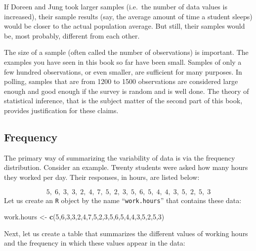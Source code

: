 \documentclass[]{krantz}
\makeatletter
\newenvironment{Shaded}{\begin{snugshade}}{\end{snugshade}}
\newcommand{\KeywordTok}[1]{\textcolor[rgb]{0.13,0.29,0.53}{\textbf{#1}}}
\newcommand{\DecValTok}[1]{\textcolor[rgb]{0.00,0.00,0.81}{#1}}
\newcommand{\StringTok}[1]{\textcolor[rgb]{0.31,0.60,0.02}{#1}}
\newcommand{\NormalTok}[1]{#1}
\newenvironment{kframe}{%
\medskip{}
\setlength{\fboxsep}{.8em}
 \def\at@end@of@kframe{}%
 \ifinner\ifhmode%
  \def\at@end@of@kframe{\end{minipage}}%
  \begin{minipage}{\columnwidth}%
 \fi\fi%
 \def\FrameCommand##1{\hskip\@totalleftmargin \hskip-\fboxsep
 \colorbox{shadecolor}{##1}\hskip-\fboxsep
     \hskip-\linewidth \hskip-\@totalleftmargin \hskip\columnwidth}%
 \MakeFramed {\advance\hsize-\width
   \@totalleftmargin\z@ \linewidth\hsize
   \@setminipage}}%
 {\par\unskip\endMakeFramed%
 \at@end@of@kframe}
\renewenvironment{Shaded}{\begin{kframe}}{\end{kframe}}
\theoremstyle{definition}
\theoremstyle{definition}
\theoremstyle{definition}
\theoremstyle{remark}
\makeatother
\begin{document}
If Doreen and Jung took larger samples (i.e.~the number of data values
is increased), their sample results (say, the average amount of time a
student sleeps) would be closer to the actual population average. But
still, their samples would be, most probably, different from each other.

The size of a sample (often called the number of observations) is
important. The examples you have seen in this book so far have been
small. Samples of only a few hundred observations, or even smaller, are
sufficient for many purposes. In polling, samples that are from 1200 to
1500 observations are considered large enough and good enough if the
survey is random and is well done. The theory of statistical inference,
that is the subject matter of the second part of this book, provides
justification for these claims.

\subsection{Frequency}\label{frequency}

The primary way of summarizing the variability of data is via the
frequency distribution. Consider an example. Twenty students were asked
how many hours they worked per day. Their responses, in hours, are
listed below:

\[5,\; 6,\; 3,\; 3,\; 2,\; 4,\; 7,\; 5,\; 2,\; 3,\; 5,\; 6,\; 5,\; 4,\; 4,\; 3,\; 5,\; 2,\; 5,\; 3\]
Let us create an \texttt{R} object by the name ``\texttt{work.hours}''
that contains these data:

\begin{Shaded}
\begin{Highlighting}[]
\NormalTok{work.hours <-}\StringTok{ }\KeywordTok{c}\NormalTok{(}\DecValTok{5}\NormalTok{,}\DecValTok{6}\NormalTok{,}\DecValTok{3}\NormalTok{,}\DecValTok{3}\NormalTok{,}\DecValTok{2}\NormalTok{,}\DecValTok{4}\NormalTok{,}\DecValTok{7}\NormalTok{,}\DecValTok{5}\NormalTok{,}\DecValTok{2}\NormalTok{,}\DecValTok{3}\NormalTok{,}\DecValTok{5}\NormalTok{,}\DecValTok{6}\NormalTok{,}\DecValTok{5}\NormalTok{,}\DecValTok{4}\NormalTok{,}\DecValTok{4}\NormalTok{,}\DecValTok{3}\NormalTok{,}\DecValTok{5}\NormalTok{,}\DecValTok{2}\NormalTok{,}\DecValTok{5}\NormalTok{,}\DecValTok{3}\NormalTok{)}
\end{Highlighting}
\end{Shaded}

Next, let us create a table that summarizes the different values of
working hours and the frequency in which these values appear in the
data:
\end{document}

